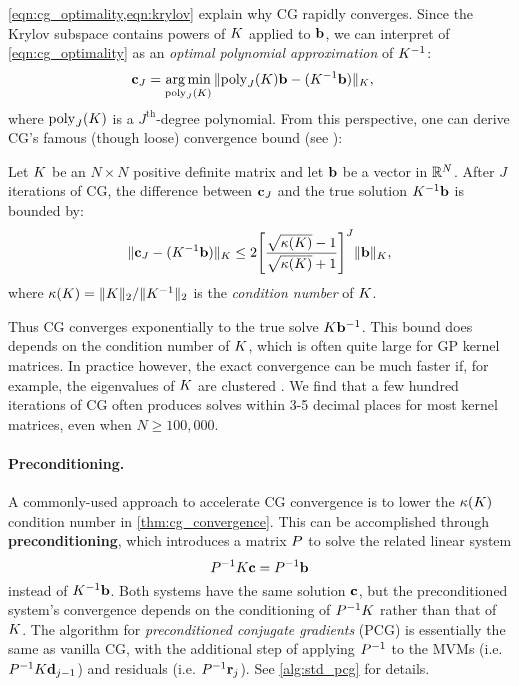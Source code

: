 \cref{eqn:cg_optimality,eqn:krylov} explain why CG rapidly converges.
Since the Krylov subspace contains powers of $K$ applied to $\mathbf{b}$, we can interpret of \cref{eqn:cg_optimality} as an \emph{optimal polynomial approximation} of $K^{-1}$:
%
\begin{align*}
  \mathbf{c}_J &= \operatorname*{arg\,min}_{\text{poly}_J(K)} \Vert \text{poly}_J(K)\mathbf{b} - (K^{-1} \mathbf{b}) \Vert_{K},
\end{align*}
%
where $\text{poly}_J(K)$ is a $J^\text{th}$-degree polynomial.
From this perspective, one can derive CG's famous (though loose) convergence bound (see \citep[e.g.][Ch. 9]{shewchuk1994introduction}):
%
\begin{theorem}[Convergence of CG]
  \label{thm:cg_convergence}
  Let $K$ be an $N \times N$ positive definite matrix and let $\mathbf{b}$ be a vector in $\mathbb{R}^N$.
  After $J$ iterations of CG, the difference between $\mathbf{c}_J$ and the true solution $K^{-1} \mathbf{b}$ is bounded by:
  \begin{equation*}
    \Vert \mathbf{c}_J - (K^{-1} \mathbf{b}) \Vert_{K}
    \leq
    2 \Bigg[ \frac{ \sqrt{ \kappa(K) } - 1 }{\sqrt{ \kappa(K) } + 1} \Biggr]^J \Vert \mathbf{b} \Vert_{K},
  \end{equation*}
  where $\kappa(K) = \Vert K \Vert_2 / \Vert K^{-1} \Vert_2$ is the \emph{condition number} of $K$.
\end{theorem}
%
Thus CG converges exponentially to the true solve $K \mathbf{b}^{-1}$.
This bound does depends on the condition number of $K$, which is often quite large for GP kernel matrices.
In practice however, the exact convergence can be much faster if, for example, the eigenvalues of $K$ are clustered \cite{saad2003iterative}.
We find that a few hundred iterations of CG often produces solves within 3-5 decimal places for most kernel matrices, even when $N \geq 100,\!000$.

\paragraph{Preconditioning.}
A commonly-used approach to accelerate CG convergence is to lower the $\kappa(K)$ condition number in \cref{thm:cg_convergence}.
This can be accomplished through {\bf preconditioning}, which introduces a matrix $P$ to solve the related linear system
%
\[
  P^{-1} K \mathbf{c} = P^{-1} \mathbf{b}
\]
%
instead of $K^{-1} \mathbf{b}$.
Both systems have the same solution $\mathbf{c}$, but the preconditioned system's convergence depends on the conditioning of $P^{-1} K$ rather than that of $K$.
The algorithm for \emph{preconditioned conjugate gradients} (PCG) is essentially the same as vanilla CG, with the additional step of applying $P^{-1}$ to the MVMs (i.e. $P^{-1} K \mathbf{d}_{j-1}$) and residuals (i.e. $P^{-1} \mathbf{r}_j$).
See \cref{alg:std_pcg} for details.

